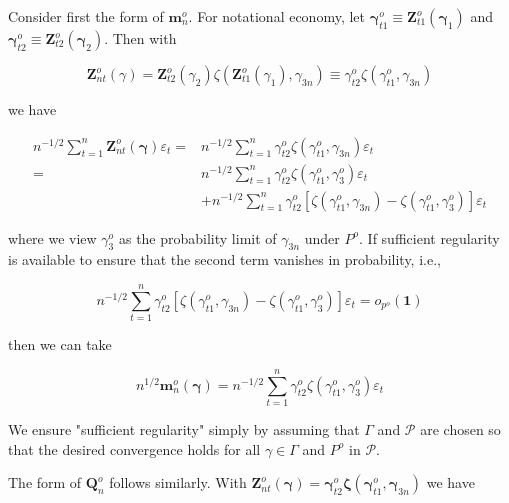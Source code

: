 \documentclass[10pt]{article}
\begin{document}
Consider first the form of $\mathbf{m}_{n}^{o}$. For notational economy, let $\boldsymbol{\gamma}_{t 1}^{o} \equiv \mathbf{Z}_{t 1}^{o}\left(\boldsymbol{\gamma}_{1}\right)$ and $\boldsymbol{\gamma}_{t 2}^{o} \equiv \mathbf{Z}_{t 2}^{o}\left(\boldsymbol{\gamma}_{2}\right)$. Then with

$$
\mathbf{Z}_{n t}^{o}(\gamma)=\mathbf{Z}_{t 2}^{o}\left(\gamma_{2}\right) \zeta\left(\mathbf{Z}_{t 1}^{o}\left(\gamma_{1}\right), \gamma_{3 n}\right) \equiv \gamma_{t 2}^{o} \zeta\left(\gamma_{t 1}^{o}, \gamma_{3 n}\right)
$$

we have

$$
\begin{aligned}
n^{-1 / 2} \sum_{t=1}^{n} \mathbf{Z}_{n t}^{o}(\boldsymbol{\gamma}) \varepsilon_{t}= & n^{-1 / 2} \sum_{t=1}^{n} \gamma_{t 2}^{o} \zeta\left(\gamma_{t 1}^{o}, \gamma_{3 n}\right) \varepsilon_{t} \\
= & n^{-1 / 2} \sum_{t=1}^{n} \gamma_{t 2}^{o} \zeta\left(\gamma_{t 1}^{o}, \gamma_{3}^{o}\right) \varepsilon_{t} \\
& +n^{-1 / 2} \sum_{t=1}^{n} \gamma_{t 2}^{o}\left[\zeta\left(\gamma_{t 1}^{o}, \gamma_{3 n}\right)-\zeta\left(\gamma_{t 1}^{o}, \gamma_{3}^{o}\right)\right] \varepsilon_{t}
\end{aligned}
$$

where we view $\gamma_{3}^{o}$ as the probability limit of $\gamma_{3 n}$ under $P^{o}$. If sufficient regularity is available to ensure that the second term vanishes in probability, i.e.,

$$
n^{-1 / 2} \sum_{t=1}^{n} \gamma_{t 2}^{o}\left[\zeta\left(\gamma_{t 1}^{o}, \gamma_{3 n}\right)-\zeta\left(\gamma_{t 1}^{o}, \gamma_{3}^{o}\right)\right] \varepsilon_{t}=o_{p^{o}}(\mathbf{1})
$$

then we can take

$$
n^{1 / 2} \mathbf{m}_{n}^{o}(\boldsymbol{\gamma})=n^{-1 / 2} \sum_{t=1}^{n} \gamma_{t 2}^{o} \zeta\left(\gamma_{t 1}^{o}, \gamma_{3}^{o}\right) \varepsilon_{t}
$$

We ensure "sufficient regularity" simply by assuming that $\Gamma$ and $\mathcal{P}$ are chosen so that the desired convergence holds for all $\gamma \in \Gamma$ and $P^{o}$ in $\mathcal{P}$.

The form of $\mathbf{Q}_{n}^{o}$ follows similarly. With $\mathbf{Z}_{n t}^{o}(\boldsymbol{\gamma})=\boldsymbol{\gamma}_{t 2}^{o} \boldsymbol{\zeta}\left(\boldsymbol{\gamma}_{t 1}^{o}, \boldsymbol{\gamma}_{3 n}\right)$ we have
\end{document}
